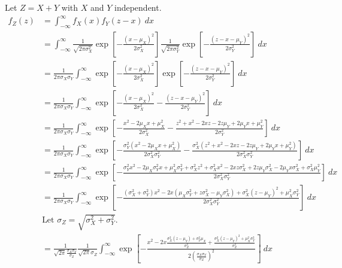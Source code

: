 \documentclass{article}
\numberwithin{equation}{section}
\numberwithin{figure}{section}
\begin{document}
Let $Z = X + Y$ with $X$ and $Y$ independent.
{
  \allowdisplaybreaks
\begin{align*}
  f_Z(z) &= \int_{-\infty}^{\infty} f_X(x) f_Y(z - x) \: dx \\
  &= \int_{-\infty}^{\infty} \frac{1}{\sqrt{2 \pi \sigma_X^2}} \exp \left[{-\frac{(x - \mu_X)^2}{2 \sigma_X^2}} \right] \frac{1}{\sqrt{2 \pi \sigma_Y^2}} \exp \left[{-\frac{(z - x - \mu_Y)^2}{2 \sigma_Y^2}} \right] \: dx \\[10pt]
  &= \frac{1}{2 \pi \sigma_X \sigma_Y} \int_{-\infty}^{\infty} \exp \left[{-\frac{(x - \mu_X)^2}{2 \sigma_X^2}} \right] \exp \left[{-\frac{(z - x - \mu_Y)^2}{2 \sigma_Y^2}} \right] \: dx \\[10pt]
  &= \frac{1}{2 \pi \sigma_X \sigma_Y} \int_{-\infty}^{\infty} \exp\left[{-\frac{(x - \mu_X)^2}{2 \sigma_X^2} - \frac{(z - x - \mu_Y)^2}{2 \sigma_Y^2}} \right] \: dx \\[10pt]
  &= \frac{1}{2 \pi \sigma_X \sigma_Y} \int_{-\infty}^{\infty} \exp\left[{-\frac{x^2 - 2 \mu_X x + \mu_X^2}{2 \sigma_X^2} - \frac{z^2 + x^2 - 2 x z - 2 z \mu_Y + 2 \mu_Y x + \mu_Y^2}{2 \sigma_Y^2}} \right] \: dx \\[10pt]
  &= \frac{1}{2 \pi \sigma_X \sigma_Y} \int_{-\infty}^{\infty} \exp\left[{-\frac{\sigma_Y^2(x^2 - 2 \mu_X x + \mu_X^2)}{2 \sigma_X^2 \sigma_Y^2} - \frac{\sigma_X^2(z^2 + x^2 - 2 x z - 2 z \mu_Y + 2 \mu_Y x + \mu_Y^2)}{2 \sigma_X^2 \sigma_Y^2 }} \right] \: dx \\[10pt]
  &= \frac{1}{2 \pi \sigma_X \sigma_Y} \int_{-\infty}^{\infty} \exp\left[{-\frac{\sigma_Y^2 x^2 - 2 \mu_X \sigma_Y^2 x + \mu_X^2 \sigma_Y^2 + \sigma_X^2 z^2 + \sigma_X^2 x^2 - 2xz\sigma_X^2 + 2 z \mu_Y \sigma_X^2 - 2\mu_Y x \sigma_X^2 + \sigma_X^2 \mu_Y^2}{2 \sigma_X^2 \sigma_Y^2}} \right] \: dx \\[10pt]
  &= \frac{1}{2 \pi \sigma_X \sigma_Y} \int_{-\infty}^{\infty} \exp\left[{-\frac{\left(\sigma_X^2 + \sigma_Y^2\right) x^2 - 2 x \left( \mu_X \sigma_Y^2 + z \sigma_X^2 - \mu_Y \sigma_X^2 \right) + \sigma_X^2 \left( z - \mu_Y \right)^2 + \mu_X^2 \sigma_Y^2}{2 \sigma_X^2 \sigma_Y^2}} \right] \: dx \\[10pt]
  &\text{Let $\sigma_Z = \sqrt{\sigma_X^2 + \sigma_Y^2}$}. \\
  &= \frac{1}{\sqrt{2 \pi} \frac{\sigma_X \sigma_Y}{\sigma_Z}} \frac{1}{\sqrt{2 \pi} \sigma_Z} \int_{-\infty}^{\infty} \exp\left[{-\frac{x^2 - 2x \frac{\sigma_X^2 (z - \mu_Y) + \sigma_Y^2 \mu_X}{\sigma_Z^2} + \frac{\sigma_X^2 \left( z - \mu_Y \right)^2 + \mu_X^2 \sigma_Y^2}{\sigma_Z^2}}{2 \left(\frac{\sigma_X \sigma_Y}{\sigma_Z}\right)^2}} \right] \: dx \\[10pt]

\end{align*}}
\end{document}
